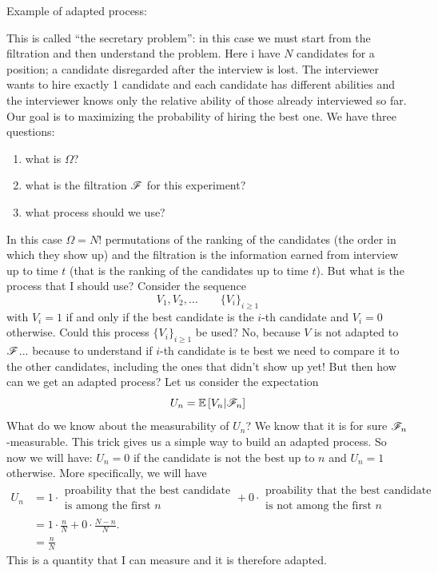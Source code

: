 \documentclass{report}
\begin{document}
Example of adapted process:
\begin{example}
	This is called ``the secretary problem'': in this case we must start from the filtration and then understand the problem.
	Here i have $N$ candidates for a position; a candidate disregarded after the interview is lost. The interviewer wants to hire exactly 1 candidate and each candidate has different abilities and the interviewer knows only the relative ability of those already interviewed so far. Our goal is to maximizing the probability of hiring the best one. We have three questions:
	\begin{enumerate}
		\item what is $\Omega$?
		\item what is the filtration $\mathscr{F}$ for this experiment?
		\item what process should we use?
	\end{enumerate}
	In this case $\Omega=N!$ permutations of the ranking of the candidates (the order in which they show up) and the filtration is the information earned from interview up to time $t$ (that is the ranking of the candidates up to time $t$). But what is the process that I should use? Consider the sequence
	\[V_1,V_2,\ldots\qquad{\{V_i\}}_{i\geq 1}\]
	with $V_i=1$ if and only if the best candidate is the $i$-th candidate and $V_i=0$ otherwise. Could this process ${\{V_i\}}_{i\geq 1}$ be used? No, because $V$ is not adapted to $\mathscr{F}$... because to understand if $i$-th candidate is te best we need to compare it to the other candidates, including the ones that didn't show up yet! But then how can we get an adapted process? Let us consider the expectation
	\[U_n=\mathbb{E}\left[V_n|\mathscr{F}_n\right]\]
	What do we know about the measurability of $U_n$? We know that it is for sure $\mathscr{F}_n$-measurable. This trick gives us a simple way to build an adapted process. So now we will have:
	$U_n=
	0$ if the candidate is not the best up to $n$ and $U_n=1$ otherwise. More specifically, we will have
	\begin{align*}
		U_n&=1\cdot\substack{\text{proability that the best candidate}\\\text{is among the first $n$}}+0\cdot\substack{\text{proability that the best candidate}\\\text{is not among the first $n$}}\\
		&=1\cdot\frac{n}{N}+0\cdot\frac{N-n}{N}.\\
		&=\frac{n}{N}
	\end{align*}
	This is a quantity that I can measure and it is therefore adapted.\par
\end{example}
\end{document}
